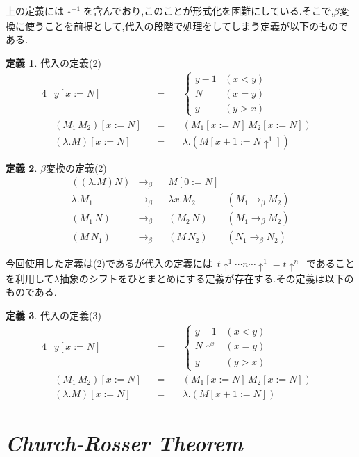 \documentclass[a4j,10pt]{jsarticle}
\theoremstyle{definition}
\newtheorem{definition}{定義}
\newcommand{\betah}{\longrightarrow_\beta }
\begin{document}
上の定義には\(\uparrow^{-1}\)を含んでおり,このことが形式化を困難にしている.そこで,\(\beta\)変換に使うことを前提として,代入の段階で処理をしてしまう定義が以下のものである.
\begin{definition}
代入の定義(2)
\begin{alignat}{4}
    & y[x:=N]& &=\ & & \left\{
    \begin{array}{lll}
        y - 1 & (x < y)\\
        N &(x = y) \\
        y & (y > x) 
    \end{array} \right. &\\
    & (M_1\, M_2)[x:=N]& &=\ & &(M_1[x:=N]\, M_2[x:=N])& \\
    & (\lambda. M)[x:= N]& &=\ & &\lambda. (M[x + 1 := N\uparrow^1])&
\end{alignat}
\end{definition}
\begin{definition}
\(\beta\)変換の定義(2)
\begin{align}
    ((\lambda. M) N) &\betah& & M[0:= N] & \\
    \lambda. M_1 &\betah& &\lambda x. M_2 &(M_1 \betah M_2)\\
    (M_1\, N) &\betah& &(M_2\, N) & (M_1 \betah M_2)\\
    (M\, N_1) &\betah& &(M\, N_2) & (N_1 \betah N_2)
\end{align}
\end{definition}
今回使用した定義は(2)であるが代入の定義には\ \(t\uparrow^1 \cdots n \cdots\uparrow^1 = t \uparrow^n\)\ であることを利用して\(\lambda\)抽象のシフトをひとまとめにする定義が存在する.その定義は以下のものである.
\begin{definition}
代入の定義(3)
\begin{alignat}{4}
    & y[x:=N]& &=\ & &\left\{
    \begin{array}{lll}
        y - 1 & (x < y)\\
        N\uparrow^x &(x = y) \\
        y & (y > x) 
    \end{array} \right. &\\
    & (M_1\, M_2)[x:=N]& &=\ & & (M_1[x:=N]\, M_2[x:=N])& \\
    & (\lambda. M)[x:= N]& &=\ & & \lambda. (M[x + 1 := N])&
\end{alignat}
\end{definition}


\section{\sl \textbf{Church-Rosser Theorem}}
\end{document}
